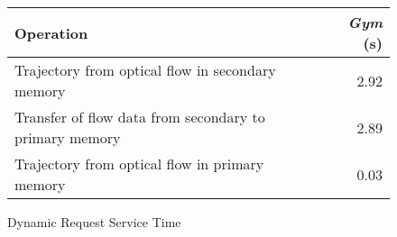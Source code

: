 \begin{figure}
\centering
\caption{Dynamic Request Service Time}
\label{conclusiontime}
\begin{tabular}{l | r}
\textbf{Operation} & \textbf{\textit{Gym}} (s) \\
\hline
Trajectory from optical flow in secondary memory & 2.92 \\
Transfer of flow data from secondary to primary memory & 2.89 \\
Trajectory from optical flow in primary memory & 0.03
\end{tabular}
\end{figure}

